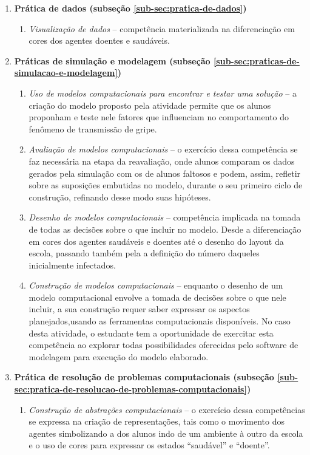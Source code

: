 \begin{enumerate}
  \item \textbf{Prática de dados (subseção \ref{sub-sec:pratica-de-dados})}
    \begin{enumerate}
      \item \textit{Visualização de dados} -- competência materializada na diferenciação em cores dos agentes doentes e saudáveis.
    \end{enumerate}

  \item \textbf{Práticas de simulação e modelagem (subseção \ref{sub-sec:praticas-de-simulacao-e-modelagem})}
    \begin{enumerate}
      \item \textit{Uso de modelos computacionais para encontrar e testar uma solução} -- a criação do modelo proposto pela atividade permite que os alunos proponham e teste nele fatores que influenciam no comportamento do fenômeno de transmissão de gripe.

      \item \textit{Avaliação de modelos computacionais} -- o exercício dessa competência se faz necessária na etapa da reavaliação, onde alunos comparam os dados gerados pela simulação com os de alunos faltosos e podem, assim, refletir sobre as suposições embutidas no modelo, durante o seu primeiro ciclo de construção, refinando desse modo suas hipóteses.

      \item \textit{Desenho de modelos computacionais} -- competência implicada na tomada de todas as decisões sobre o que incluir no modelo. Desde a diferenciação em cores dos agentes saudáveis e doentes até o desenho do layout da escola, passando também pela a definição do número daqueles inicialmente infectados.

      \item \textit{Construção de modelos computacionais} -- enquanto o desenho de um modelo computacional envolve a tomada de decisões sobre o que nele incluir, a sua construção requer saber expressar os aspectos planejados,usando as ferramentas computacionais disponíveis. No caso desta atividade, o estudante tem a oportunidade de exercitar esta competência ao explorar todas possibilidades oferecidas pelo software de modelagem para execução do modelo elaborado. 
    \end{enumerate}

  \item \textbf{Prática de resolução de problemas computacionais (subseção \ref{sub-sec:pratica-de-resolucao-de-problemas-computacionais})} 
  
  \begin{enumerate}
    \item \textit{Construção de abstrações computacionais} -- o exercício dessa competências se expressa na criação de representações, tais como o movimento dos agentes simbolizando a dos alunos indo de um ambiente à outro da escola e o uso de cores para expressar os estados ``saudável'' e ``doente''.
  \end{enumerate}
\end{enumerate}






